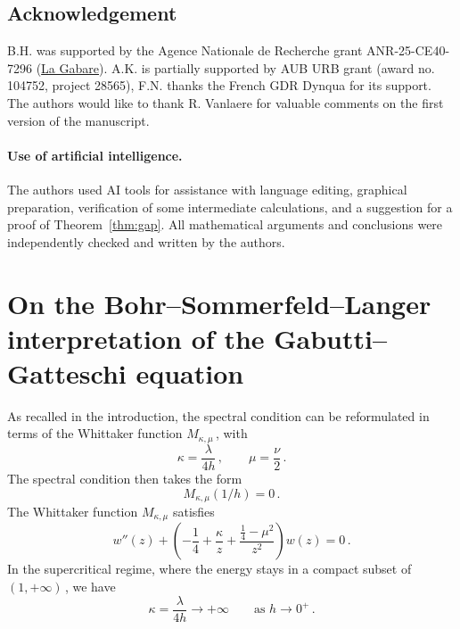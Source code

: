 \documentclass[11pt]{amsart}
\numberwithin{equation}{section}
\theoremstyle{remark}
\newcommand{\mn}{\medskip\noindent}
\begin{document}
\subsection*{Acknowledgement} B.H. was
supported by the Agence Nationale de Recherche grant ANR-25-CE40-7296
(\href{https://anr.fr/Projet-ANR-25-CE40-7296}{La Gabare}). A.K. is partially supported by AUB URB grant (award no. 104752, project 28565), F.N. thanks the French GDR Dynqua for its support. The authors would like to thank R. Vanlaere for valuable comments on the first version of the manuscript.

\paragraph{\bf Use of artificial intelligence.}
The authors used AI tools for assistance with language editing,
graphical preparation, verification of some intermediate calculations, and a suggestion for a proof of Theorem~\ref{thm:gap}.
All mathematical arguments and conclusions were  independently checked
and written by the authors. 

\appendix 

\section{On the Bohr--Sommerfeld--Langer interpretation of the
Gabutti--Gatteschi equation}\label{AppA}



\mn
As recalled in the introduction, the spectral condition can be
reformulated in terms of the Whittaker function
$M_{\kappa,\mu}\,$, with
\begin{equation}\label{Whittaker-parameters-App}
\kappa=\frac{\lambda}{4h}\,,
\qquad
\mu=\frac{\nu}{2}\,.
\end{equation}
The spectral condition then takes the form
\begin{equation}\label{Whittaker-spectral-condition-App}
M_{\kappa,\mu}(1/h)=0\,.
\end{equation}
The Whittaker function $M_{\kappa,\mu}$ satisfies
\begin{equation}\label{Whittaker-equation}
w''(z)+
\left(
-\frac14+\frac{\kappa}{z}
+\frac{\frac14-\mu^2}{z^2}
\right)w(z)=0\,.
\end{equation}
In the supercritical regime, where the energy stays in a compact
subset of $(1,+\infty)\,$, we have
\begin{equation}\label{kappa-semiclassical-App}
\kappa=\frac{\lambda}{4h}\longrightarrow+\infty
\qquad\text{as }h\to0^+\,.
\end{equation}
\end{document}
